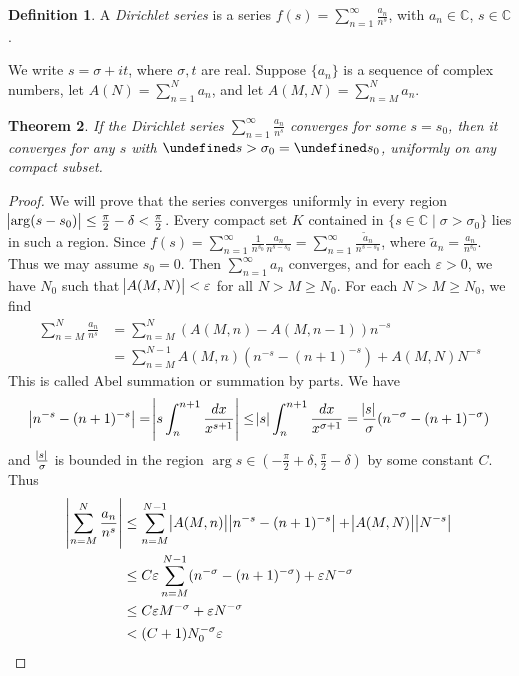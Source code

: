 \documentclass[11pt]{article}
\theoremstyle{definition}
\newtheorem{definition}{Definition}[section]
\theoremstyle{plain}
\newtheorem{theorem}[definition]{Theorem}
\theoremstyle{remark}
\let\Re\undefined
\DeclareMathOperator{\Re}{Re}
\newcommand{\CC}{\mathbb{C}}
\begin{document}
\begin{definition}\label{def:5_1}
    A \emph{Dirichlet series} is a series $f(s) = \sum_{n=1}^\infty \frac{a_n}{n^s}$, with $a_n \in \CC$, $s \in \CC$.
\end{definition}

We write $s = \sigma + i t$, where $\sigma, t$ are real. Suppose $\{a_n\}$ is a sequence of complex numbers, let $A(N) = \sum_{n=1}^N a_n$, and let $A(M, N) = \sum_{n=M}^N a_n$.

\begin{theorem}\label{thm:5_2}
    If the Dirichlet series $\sum_{n=1}^\infty \frac{a_n}{n^s}$ converges for some $s = s_0$, then it converges for any $s$ with $\Re s > \sigma_0 = \Re s_0$, uniformly on any compact subset.
\end{theorem}
\begin{proof}
    We will prove that the series converges uniformly in every region $\abs{\arg(s-s_0)} \le \frac{\pi}{2} - \delta < \frac{\pi}{2}$. Every compact set $K$ contained in $\{s \in \CC \mid \sigma > \sigma_0 \}$ lies in such a region. Since $f(s) = \sum_{n=1}^\infty \frac{1}{n^{s_0}} \frac{a_n}{n^{s-s_0}} = \sum_{n=1}^{\infty} \frac{\widetilde{a}_n}{n^{s-s_0}}$, where $\widetilde{a}_n = \frac{a_n}{n^{s_0}}$. Thus we may assume $s_0 = 0$. Then $\sum_{n=1}^\infty a_n$ converges, and for each $\varepsilon > 0$, we have $N_0$ such that $\abs{A(M, N)} < \varepsilon$ for all $N > M \ge N_0$. For each $N > M \ge N_0$, we find
    \begin{align*}
        \sum_{n=M}^{N} \frac{a_n}{n^s}
        &= \sum_{n=M}^{N} (A(M,n) - A(M,n-1)) n^{-s}\\
        &= \sum_{n=M}^{N-1} A(M,n) (n^{-s} - (n+1)^{-s}) + A(M, N) N^{-s}
    \end{align*}
    This is called Abel summation or summation by parts. We have
    \begin{equation*}
        \abs{n^{-s} - (n+1)^{-s}} = \abs{s \int_{n}^{n+1} \frac{dx}{x^{s+1}}} \le \abs{s} \int_{n}^{n+1} \frac{dx}{x^{\sigma+1}} = \frac{\abs{s}}{\sigma} (n^{-\sigma} - (n+1)^{-\sigma})
    \end{equation*}
    and $\frac{\abs{s}}{\sigma}$ is bounded in the region $\arg s \in (-\frac{\pi}{2} + \delta, \frac{\pi}{2} - \delta)$ by some constant $C$. Thus
    \begin{align*}
        \abs{\sum_{n=M}^{N} \frac{a_n}{n^s}}
        &\le \sum_{n=M}^{N-1} \abs{A(M,n)} \abs{n^{-s} - (n+1)^{-s}} + \abs{A(M, N)} \abs{N^{-s}}\\
        &\le C \varepsilon \sum_{n=M}^{N-1} (n^{-\sigma} - (n+1)^{-\sigma}) + \varepsilon N^{-\sigma}\\
        &\le C \varepsilon M^{-\sigma} + \varepsilon N^{-\sigma}\\
        &< (C + 1) N_0^{-\sigma} \varepsilon
    \end{align*}
\end{proof}
\end{document}

